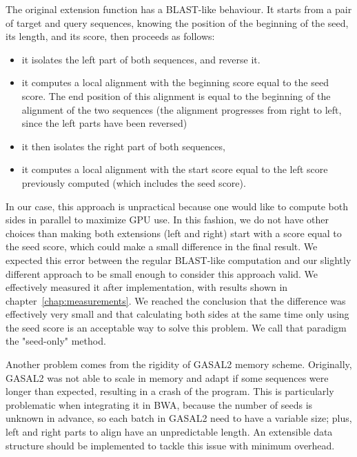 The original extension function has a BLAST-like behaviour. It starts from a pair of target and query sequences, knowing the position of the beginning of the seed, its length, and its score, then proceeds as follows:
\begin{itemize}
	\item it isolates the left part of both sequences, and reverse it.
	\item it computes a local alignment with the beginning score equal to the seed score. The end position of this alignment is equal to the beginning of the alignment of the two sequences (the alignment progresses from right to left, since the left parts have been reversed)
	\item it then isolates the right part of both sequences,
	\item it computes a local alignment with the start score equal to the left score previously computed (which includes the seed score).
\end{itemize}

In our case, this approach is unpractical because one would like to compute both sides in parallel to maximize GPU use. In this fashion, we do not have other choices than making both extensions (left and right) start with a score equal to the seed score, which could make a small difference in the final result. We expected this error between the regular BLAST-like computation and our slightly different approach to be small enough to consider this approach valid. We effectively measured it after implementation, with results shown in chapter~\ref{chap:measurements}. We reached the conclusion that the difference was effectively very small and that calculating both sides at the same time only using the seed score is an acceptable way to solve this problem. We call that paradigm the "seed-only" method.

Another problem comes from the rigidity of GASAL2 memory scheme. Originally, GASAL2 was not able to scale in memory and adapt if some sequences were longer than expected, resulting in a crash of the program. This is particularly problematic when integrating it in BWA, because the number of seeds is unknown in advance, so each batch in GASAL2 need to have a variable size; plus, left and right parts to align have an unpredictable length. 
An extensible data structure should be implemented to tackle this issue with minimum overhead.


